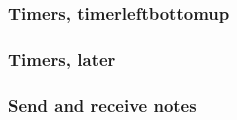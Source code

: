 \documentclass{article}
\begin{document}
{
\begin{chrono}[]
\testx
\end{chrono}
\hfill
\begin{chrono}[]
\testxi
\end{chrono}

\begin{hchrono}
\testx
\end{hchrono}

\bigskip

\begin{hchrono}
\testxi
\end{hchrono}
}

\subsubsection*{Timers, timerleftbottomup}

{
\begin{chrono}[]
\testx
\end{chrono}
\hfill
\begin{chrono}[]
\testxi
\end{chrono}

\begin{hchrono}
\testx
\end{hchrono}

\bigskip

\begin{hchrono}
\testxi
\end{hchrono}
}
\vfill

\subsubsection*{Timers, later}

\begin{chrono}
  \testlater
\end{chrono}
\begin{chrono}[timerleftbelow]
  \testlater
\end{chrono}
\begin{chrono}[timerleftbottomup]
  \testlater
\end{chrono}
\begin{chrono}
  \testlateri
\end{chrono}


\subsubsection*{Send and receive notes}
\end{document}
